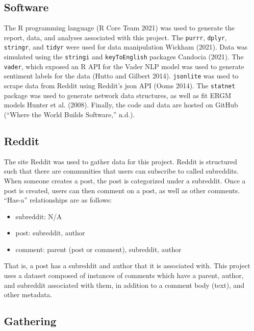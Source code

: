 \documentclass[
]{article}
\providecommand{\tightlist}{%
  \setlength{\itemsep}{0pt}\setlength{\parskip}{0pt}}
\begin{document}
\hypertarget{software}{%
\subsection{Software}\label{software}}

The R programming language (R Core Team 2021) was used to generate the report, data, and analyses associated with this project. The \texttt{purrr}, \texttt{dplyr}, \texttt{stringr}, and \texttt{tidyr} were used for data manipulation Wickham (2021). Data was simulated using the \texttt{stringi} and \texttt{keyToEnglish} packages Candocia (2021). The \texttt{vader}, which exposed an R API for the Vader NLP model was used to generate sentiment labels for the data (Hutto and Gilbert 2014). \texttt{jsonlite} was used to scrape data from Reddit using Reddit's json API (Ooms 2014). The \texttt{statnet} package was used to generate network data structures, as well as fit ERGM models Hunter et al. (2008). Finally, the code and data are hosted on GitHub ({``Where the World Builds Software,''} n.d.).

\hypertarget{reddit}{%
\subsection{Reddit}\label{reddit}}

The site Reddit was used to gather data for this project. Reddit is structured such that there are communities that users can subscribe to called subreddits. When someone creates a post, the post is categorized under a subreddit. Once a post is created, users can then comment on a post, as well as other comments. ``Has-a'' relationships are as follows:

\begin{itemize}
\tightlist
\item
  subreddit: N/A
\item
  post: subreddit, author
\item
  comment: parent (post or comment), subreddit, author
\end{itemize}

That is, a post has a subreddit and author that it is associated with. This project uses a dataset composed of instances of comments which have a parent, author, and subreddit associated with them, in addition to a comment body (text), and other metadata.

\hypertarget{gathering}{%
\subsection{Gathering}\label{gathering}}
\end{document}
